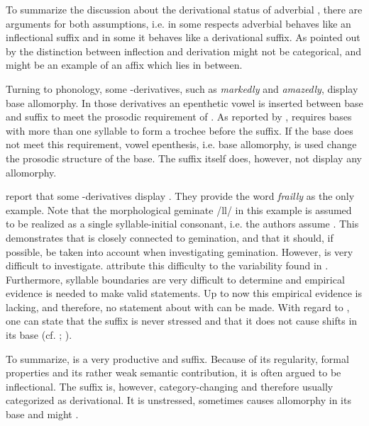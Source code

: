 To summarize the discussion about the derivational status of adverbial , there are arguments for both assumptions, i.e. in some respects adverbial  behaves like an inflectional suffix and in some it behaves like a derivational suffix. As pointed out by \citet[196]{Plag.2003} the distinction between inflection and derivation might not be categorical, and  might be an example of an affix which lies in between.

Turning to phonology, some -derivatives, such as  \textit{markedly} and \textit{amazedly}, display base allomorphy. In those derivatives an epenthetic vowel is inserted between base and suffix to meet the prosodic requirement of . As reported by \citet[172]{Bauer.2013},  requires bases with more than one syllable to form a  trochee before the suffix. If the base does not meet this requirement, vowel epenthesis, i.e. base allomorphy, is used change the prosodic structure of the base. The suffix itself does, however, not display any allomorphy. 

\citet[163]{Bauer.2013} report that some -derivatives display . They provide the word \textit{frailly} as the only example. Note that the {morphological geminate} /ll/ in this example is assumed to be realized as a single syllable-initial consonant, i.e. the authors assume . This demonstrates that  is closely connected to {gemination}, and that it should, if possible, be taken into account when investigating {gemination}.
However,  is very difficult to investigate. \citet[168]{Bauer.2013} attribute  this difficulty to the variability found in . Furthermore, syllable boundaries are very difficult to determine and empirical evidence is needed to make valid statements. Up to now this empirical evidence is lacking, and therefore, no statement about  with  can be made.
With regard to , one can state that the suffix is never stressed and that it does not cause  shifts in its base (cf. \citealt[1670]{Bauer.2002}; \citealt[323]{Bauer.2013}).

To summarize,  is a very productive and  suffix. Because of its regularity, formal properties and its rather weak semantic contribution, it is often argued to be inflectional. The suffix is, however, category-changing and therefore usually categorized as derivational. It is unstressed, sometimes causes allomorphy in its base and might .


